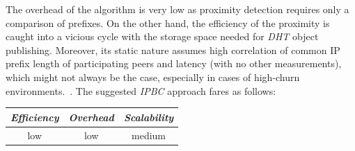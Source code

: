 The overhead of the algorithm is very low as proximity detection requires only
a comparison of prefixes. On the other hand, the efficiency of the proximity
is caught into a vicious cycle with the storage space needed for \emph{DHT} 
object publishing.
Moreover, its static nature assumes high correlation of common IP prefix
length of participating peers and latency (with no other measurements),
which might not always be the case, especially in cases of high-churn
environments.~\cite{EWF2011}.
%
%
%
The suggested \emph{IPBC} approach fares as follows:
\begin{center}
{\footnotesize
\begin{tabular}{ccc}
\emph{Efficiency} & \emph{Overhead} & \emph{Scalability} \\
\hline
low &
low &
%
medium
\end{tabular}
}
\end{center}

